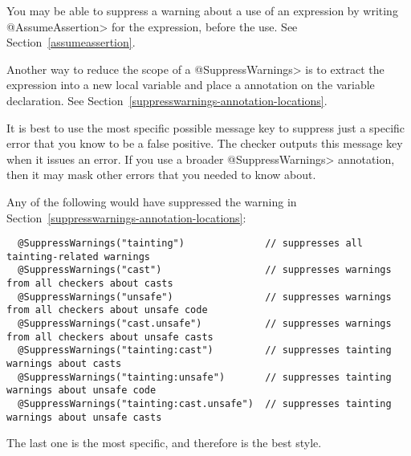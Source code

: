 You may be able to suppress a warning about a use of an expression by
writing \<@AssumeAssertion> for the expression, before the use.  See
Section~\ref{assumeassertion}.

Another way to reduce the scope of a \<@SuppressWarnings> is to
extract the expression into a new local variable
and place a  annotation on the variable
declaration.  See Section~\ref{suppresswarnings-annotation-locations}.





\label{compiler-message-keys}

It is best to use the most specific possible message key to suppress just a
specific error that you know to be a false positive.  The checker outputs
this message key when it issues an error.  If you use a broader
\<@SuppressWarnings> annotation, then it may mask other errors that you
needed to know about.

Any of the following would have suppressed the warning in
Section~\ref{suppresswarnings-annotation-locations}:

\begin{Verbatim}
  @SuppressWarnings("tainting")              // suppresses all tainting-related warnings
  @SuppressWarnings("cast")                  // suppresses warnings from all checkers about casts
  @SuppressWarnings("unsafe")                // suppresses warnings from all checkers about unsafe code
  @SuppressWarnings("cast.unsafe")           // suppresses warnings from all checkers about unsafe casts
  @SuppressWarnings("tainting:cast")         // suppresses tainting warnings about casts
  @SuppressWarnings("tainting:unsafe")       // suppresses tainting warnings about unsafe code
  @SuppressWarnings("tainting:cast.unsafe")  // suppresses tainting warnings about unsafe casts
\end{Verbatim}

The last one is the most specific, and therefore is the best style.



